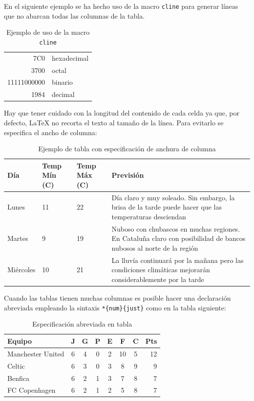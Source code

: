 \documentclass[11pt,a4paper]{article}
\begin{document}
En el siguiente ejemplo se ha hecho uso de la macro \texttt{cline} para generar líneas que no abarcan todas las columnas de la tabla.

\begin{table}[hbt]%
	\centering
	\caption{Ejemplo de uso de la macro \texttt{cline}}
	\label{tab:cline}
	\begin{tabular}[t]{|r|l|}
	\hline
	7C0 & hexadecimal \\[1cm] %
	3700 & octal \\ \cline{2-2}
	11111000000 & binario \\
	\hline \hline
	1984 & decimal \\
	\hline
	\end{tabular}
\end{table}

Hay que tener cuidado con la longitud del contenido de cada celda ya que, por defecto, \LaTeX{} no recorta el texto al tamaño de la línea. Para evitarlo se especifica el ancho de columna:

\begin{table}[hbt]%
	\centering
	\caption{Ejemplo de tabla con especificación de anchura de columna}
	\label{tab:anchura}
	\begin{tabular}{ | l | l | l | p{5cm} |}
	\hline
	Día & Temp Mín (\textdegree C) & Temp Máx (\textdegree C) & Previsión \\ \hline
	Lunes & 11 & 22 & Día claro y muy soleado. Sin embargo, la brisa de la tarde puede hacer que las temperaturas desciendan \\ \hline
	Martes & 9 & 19 & Nuboso con chubascos en muchas regiones. En Cataluña claro con posibilidad de bancos nubosos al norte de la región \\ \hline
	Miércoles & 10 & 21 & La lluvía continuará por la mañana pero las condiciones climáticas mejorarán considerablemente por la tarde\\
	\hline
	\end{tabular}
\end{table}

Cuando las tablas tienen muchas columnas es posible hacer una declaración abreviada empleando la sintaxis \texttt{*\{num\}\{just\}} como en la tabla siguiente:

\begin{table}[hbt]%
	\centering
	\caption{Especificación abreviada en tabla}
	\label{tab:abreviada}
	\begin{tabular}{l*{6}{c}|r}
	Equipo            & J & G & P & E & F  & C & Pts \\
	\hline
	Manchester United & 6 & 4 & 0 & 2 & 10 & 5 & 12  \\
	Celtic            & 6 & 3 & 0 & 3 &  8 & 9 &  9  \\
	Benfica           & 6 & 2 & 1 & 3 &  7 & 8 &  7  \\
	FC Copenhagen     & 6 & 2 & 1 & 2 &  5 & 8 &  7  \\
	\end{tabular}
\end{table}
\end{document}
